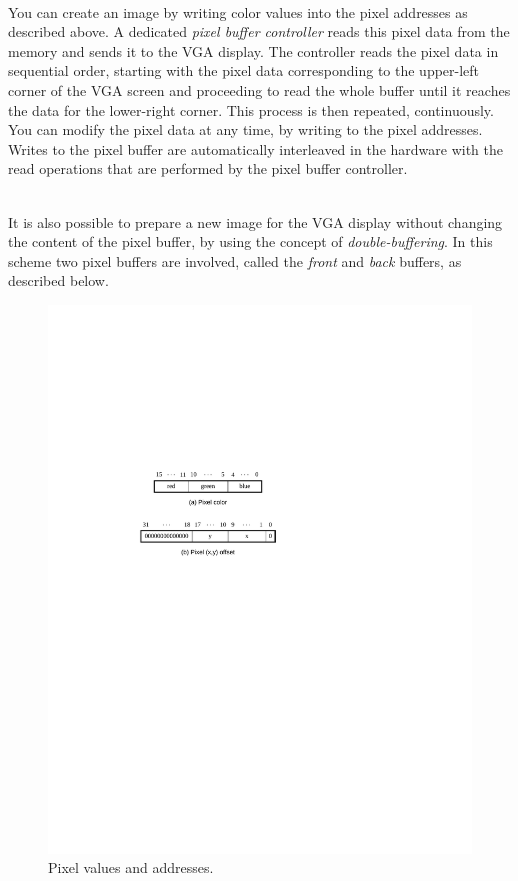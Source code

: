 \documentclass[epsfig,10pt,fullpage]{article}
\begin{document}
~\\
\noindent
You can create an image by writing color values into the pixel addresses as described
above. A dedicated {\it pixel buffer controller} reads this pixel data from the memory and 
sends it to the VGA display.  The controller reads the pixel data in sequential order, 
starting with the pixel data corresponding to the upper-left corner of the VGA screen and 
proceeding to read the whole buffer until it reaches the data for the lower-right corner. This 
process is then repeated, continuously.  You can modify the pixel data at any time, by writing 
to the pixel addresses. Writes to the pixel buffer are automatically interleaved in the 
hardware with the read operations that are performed by the pixel buffer controller. 

~\\
\noindent
It is also possible to prepare a new image for the VGA display without changing the content 
of the pixel buffer, by using the concept of {\it double-buffering}.  In this scheme two 
pixel buffers are involved, called the {\it front} and {\it back} buffers, as described below.

\begin{figure}[b]
   \begin{center}
       \includegraphics{figures/fig_pixels.pdf}
   \end{center}
   \caption{Pixel values and addresses.}
	\label{fig:pixels}
\end{figure}
\end{document}
